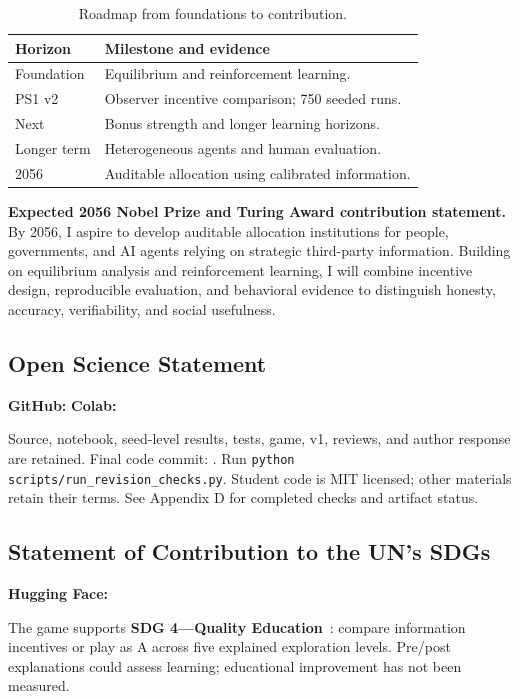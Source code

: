 \begin{table}[h]\caption{Roadmap from foundations to contribution.}
\begin{tabularx}{\columnwidth}{@{}p{1.35cm}Y@{}}\toprule
\textbf{Horizon}&\textbf{Milestone and evidence}\\\midrule
Foundation&Equilibrium and reinforcement learning.\\
PS1 v2&Observer incentive comparison; 750 seeded runs.\\
Next&Bonus strength and longer learning horizons.\\
Longer term&Heterogeneous agents and human evaluation.\\
2056&Auditable allocation using calibrated information.\\\bottomrule
\end{tabularx}\end{table}

\noindent\textbf{Expected 2056 Nobel Prize and Turing Award contribution statement.}
By 2056, I aspire to develop auditable allocation institutions for people, governments, and AI agents relying on strategic third-party information. Building on equilibrium analysis and reinforcement learning, I will combine incentive design, reproducible evaluation, and behavioral evidence to distinguish honesty, accuracy, verifiability, and social usefulness.

\subsection*{Open Science Statement}
\textbf{GitHub:} \GitHubLink\quad \textbf{Colab:} \ColabLink\par
Source, notebook, seed-level results, tests, game, v1, reviews, and author response are retained. Final code commit: \FinalCodeCommit. Run \texttt{python scripts/run\_revision\_checks.py}. Student code is MIT licensed; other materials retain their terms. See Appendix D for completed checks and artifact status.

\subsection*{Statement of Contribution to the UN's SDGs}
\textbf{Hugging Face:} \DemoLink\par
The game supports \textbf{SDG 4---Quality Education}~\cite{sdg4}: compare information incentives or play as A across five explained exploration levels. Pre/post explanations could assess learning; educational improvement has not been measured.
